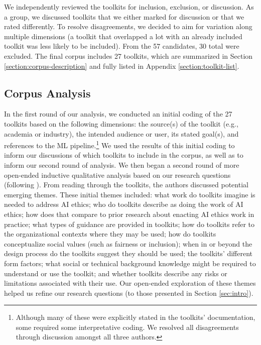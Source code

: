 \documentclass[acmsmall]{acmart}
\begin{document}
We independently reviewed the toolkits for inclusion, exclusion, or discussion. As a group, we discussed toolkits that we either marked for discussion or that we rated differently. To resolve disagreements, we decided to aim for variation along multiple dimensions (a toolkit that overlapped a lot with an already included toolkit was less likely to be included). From the 57 candidates, 30 total were excluded.
The final corpus includes 27 toolkits, which are summarized in Section \ref{section:corpus-description} and fully listed in Appendix \ref{section:toolkit-list}. 

\subsection{Corpus Analysis}
In the first round of our analysis, we conducted an initial coding %
of the 27 toolkits based on the following dimensions: the source(s) of the toolkit (e.g., academia or industry), the intended audience or user, its stated goal(s), and references to the ML pipeline.\footnote{Although many of these were explicitly stated in the toolkits' documentation, some required some interpretative coding. We resolved all disagreements through discussion amongst all three authors.} We used the results of this initial coding to inform our discussions of which toolkits to include in the corpus, as well as to inform our second round of analysis. We then began a second round of more open-ended inductive qualitative analysis based on our research questions (following \cite{braun2006using}). From reading through the toolkits, the authors discussed potential emerging themes. 
These initial themes included: what work do toolkits imagine is needed to address AI ethics; who do toolkits describe as doing the work of AI ethics; how does that compare to prior research about enacting AI ethics work in practice; what types of guidance are provided in toolkits; how do toolkits refer to the organizational contexts where they may be used; how do toolkits conceptualize social values (such as fairness or inclusion); when in or beyond the design process do the toolkits suggest they should be used; the toolkits' different form factors; what social or technical background knowledge might be required to understand or use the toolkit; and whether toolkits describe any risks or limitations associated with their use. Our open-ended exploration of these themes helped us refine our research questions (to those presented in Section \ref{sec:intro}).
\end{document}

